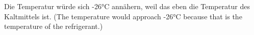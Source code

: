 Die Temperatur würde sich -26°C annähern, weil das eben die Temperatur des Kaltmittels ist.  
(The temperature would approach -26°C because that is the temperature of the refrigerant.)